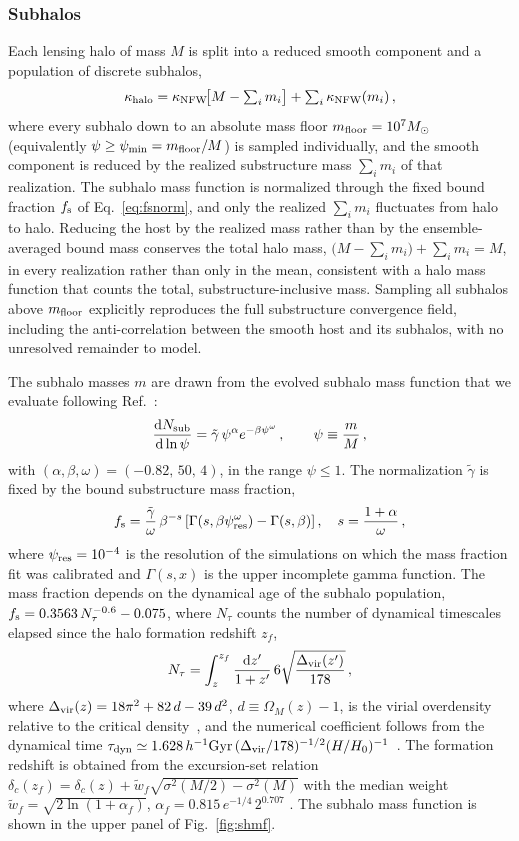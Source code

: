 \documentclass[aps,prd,10pt,nofootinbib,twocolumn,superscriptaddress,floatfix,notitlepage]{revtex4-1}
\newcommand{\Msun}{M_\odot}
\newcommand{\td}{{\rm d}}
\newcommand{\be}{\begin{equation}}
\newcommand{\ee}{\end{equation}}
\newcommand{\B}[1]{{\color{blue} #1}}
\begin{document}
\subsubsection{Subhalos}

Each lensing halo of mass $M$ is split into a reduced smooth component and a population of discrete subhalos,
\be \label{eq:reducedhost}
    \kappa_{\rm halo} = \kappa_{\rm NFW}\!\big[M - \textstyle\sum_i m_i\big] + \sum_i \kappa_{\rm NFW}(m_i) \,,
\ee
where every subhalo down to an absolute mass floor $m_{\rm floor} = 10^7\Msun$ (equivalently $\psi \geq \psi_{\rm min} = m_{\rm floor}/M$) is sampled individually, and the smooth component is reduced by the realized substructure mass $\sum_i m_i$ of that realization. The subhalo mass function is normalized through the fixed bound fraction $f_{\rm s}$ of Eq.~\eqref{eq:fsnorm}, and only the realized $\sum_i m_i$ fluctuates from halo to halo. Reducing the host by the realized mass rather than by the ensemble-averaged bound mass conserves the total halo mass, $\big(M - \sum_i m_i\big) + \sum_i m_i = M$, in every realization rather than only in the mean, consistent with a halo mass function that counts the total, substructure-inclusive mass. Sampling all subhalos above $m_{\rm floor}$ explicitly reproduces the full substructure convergence field, including the anti-correlation between the smooth host and its subhalos, with no unresolved remainder to model.

The subhalo masses $m$ are drawn from the evolved subhalo mass function that we evaluate following Ref.~\cite{Jiang:2014nsa}:
\be \label{eq:shmf}
    \frac{\td N_{\rm sub}}{\td \ln\psi} = \tilde\gamma\, \psi^{\alpha} e^{-\beta \psi^{\omega}} \,, \qquad \psi \equiv \frac{m}{M} \,,
\ee
with $(\alpha,\beta,\omega) = (-0.82,\,50,\,4)$, in the range $\psi \leq 1$. The normalization $\tilde\gamma$ is fixed by the bound substructure mass fraction,
\be \label{eq:fsnorm}
    f_{\rm s} = \frac{\tilde\gamma}{\omega}\, \beta^{-s} \left[ \Gamma\!\left(s,\beta\psi_{\rm res}^{\omega}\right) - \Gamma\!\left(s,\beta\right) \right] , \quad s = \frac{1+\alpha}{\omega} \,,
\ee
where $\psi_{\rm res}=10^{-4}$ \B{is the resolution of the simulations on which the mass fraction fit was calibrated} and $\Gamma(s,x)$ is the upper incomplete gamma function. The mass fraction depends on the dynamical age of the subhalo population, $f_{\rm s} = 0.3563\, N_\tau^{-0.6} - 0.075$, where $N_\tau$ counts the number of dynamical timescales elapsed since the halo formation redshift $z_f$,
\be
    N_\tau = \int_{z}^{z_f} \frac{\td z'}{1+z'}\, 6 \sqrt{\frac{\Delta_{\rm vir}(z')}{178}} \,,
\ee
where $\Delta_{\rm vir}(z) = 18\pi^2 + 82\,d - 39\,d^2$, $d \equiv \Omega_M(z)-1$, is the virial overdensity relative to the critical density~\cite{Bryan:1997dn}, and the numerical coefficient follows from the dynamical time $\tau_{\rm dyn} \simeq 1.628\,h^{-1}{\rm Gyr}\,(\Delta_{\rm vir}/178)^{-1/2} (H/H_0)^{-1}$~\cite{Jiang:2014nsa}. The formation redshift is obtained from the excursion-set relation $\delta_c(z_f) = \delta_c(z) + \tilde w_f \sqrt{\sigma^2(M/2) - \sigma^2(M)}$ with the median weight $\tilde w_f = \sqrt{2\ln(1+\alpha_f)}$, $\alpha_f = 0.815\, e^{-1/4}\, 2^{0.707}$ \B{\cite{Giocoli:2006yz}}. The subhalo mass function is shown in the upper panel of Fig.~\ref{fig:shmf}.
\end{document}
